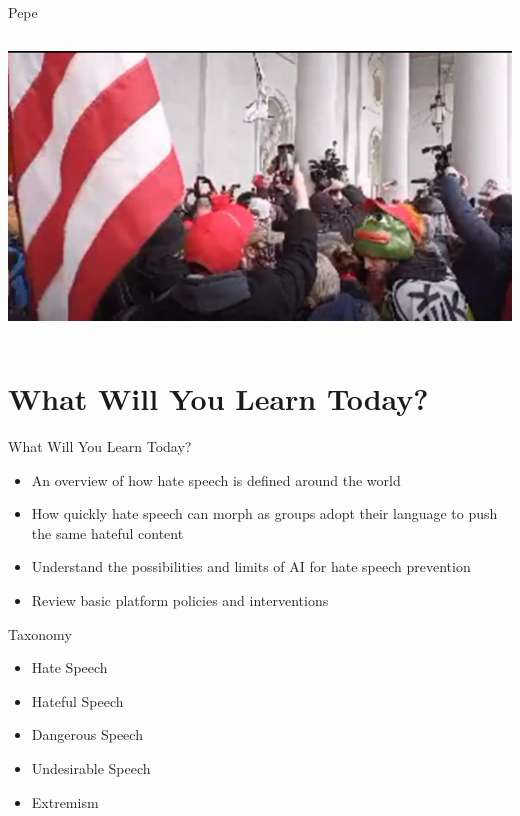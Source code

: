 \documentclass[nobackground,dvipsnames,table]{beamer}
\begin{document}
\begin{frame}{Pepe}
\begin{columns}
            \includegraphics[width=\textwidth]{pepe-jan-6}
    \end{columns}
\end{frame}

\section{What Will You Learn Today?}

\begin{frame}{What Will You Learn Today?}
    \large
    \begin{itemize}
        \item An overview of how hate speech is defined around the world
        \item How quickly hate speech can morph as groups adopt their language to push the same hateful content
        \item Understand the possibilities and limits of AI for hate speech prevention
        \item Review basic platform policies and interventions
    \end{itemize}
\end{frame}

\begin{frame}{Taxonomy}
    \large
    \begin{itemize}
        \item Hate Speech
        \item Hateful Speech
        \item Dangerous Speech
        \item Undesirable Speech
        \item Extremism
    \end{itemize}
\end{frame}
\end{document}
